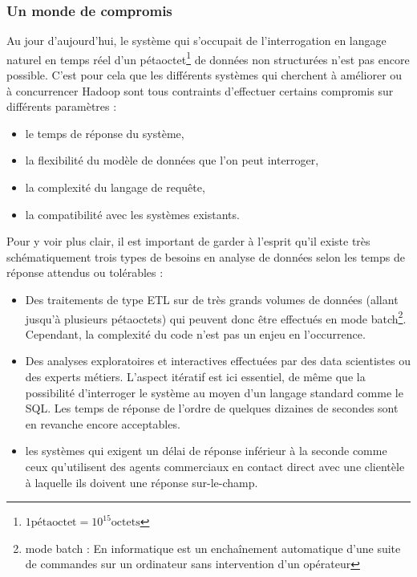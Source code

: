 \documentclass[12pt]{article}
\begin{document}
\subsubsection{Un monde de compromis}
Au jour d'aujourd'hui, le système qui s'occupait de l'interrogation en langage naturel en temps réel d'un pétaoctet\footnote{$1 \text{pétaoctet} = 10^{15} \text{octets}$} de données non structurées n'est pas encore possible. C'est pour cela que les différents systèmes qui cherchent à améliorer ou à concurrencer Hadoop sont tous contraints d'effectuer certains compromis sur différents paramètres :
\begin{itemize}
\item le temps de réponse du système,
\item la flexibilité du modèle de données que l'on peut interroger,
\item la complexité du langage de requête,
\item la compatibilité avec les systèmes existants.
\end{itemize}
\par
Pour y voir plus clair, il est important  de garder à l'esprit qu'il existe très schématiquement trois types de besoins en analyse de données selon les temps de réponse attendus ou tolérables :
\begin{itemize}
\item Des traitements de type ETL sur de très grands volumes de données (allant jusqu'à plusieurs pétaoctets) qui peuvent donc être effectués en mode batch\footnote{mode batch : En informatique est un enchaînement automatique d'une suite de commandes sur un ordinateur sans intervention d'un opérateur}. Cependant, la complexité du code n'est pas un enjeu en l'occurrence.
\item Des analyses exploratoires et interactives effectuées par des data scientistes ou des experts métiers. L'aspect itératif est ici essentiel, de même que la possibilité d'interroger le système au moyen d'un langage standard comme le SQL. Les temps de réponse de l'ordre de quelques dizaines de secondes sont en revanche encore acceptables.
\item les systèmes qui exigent un délai de réponse inférieur à la seconde comme ceux qu'utilisent des agents commerciaux en contact direct avec une clientèle à laquelle ils doivent une réponse sur-le-champ.
\end{itemize}
\end{document}
